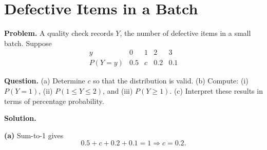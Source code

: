 		\section{Defective Items in a Batch}
		
		\textbf{Problem.}
		A quality check records $Y$, the number of defective items in a small batch. Suppose
		\[
		\begin{array}{c|cccc}
			y & 0 & 1 & 2 & 3\\
			\hline
			P(Y=y) & 0.5 & c & 0.2 & 0.1
		\end{array}
		\]
		
		\textbf{Question.}
		(a) Determine $c$ so that the distribution is valid.
		(b) Compute: (i) $P(Y=1)$, (ii) $P(1\le Y\le 2)$, and (iii) $P(Y\ge 1)$.
		(c) Interpret these results in terms of percentage probability.
		
		\textbf{Solution.}

		\textbf{(a)} Sum-to-1 gives
		\[
		0.5+c+0.2+0.1=1\Rightarrow c=0.2.
		\]

